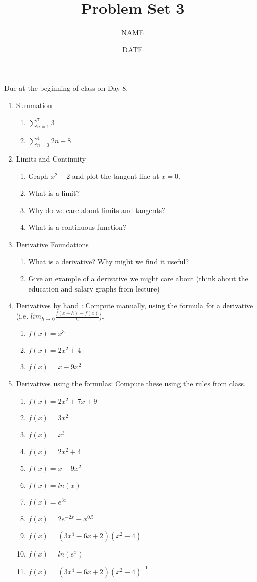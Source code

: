 \documentclass[12pt,thmsa]{article}
\title{Problem Set 3}
\author{NAME}
\date{DATE}
\begin{document}
\maketitle 

Due at the beginning of class on Day 8.  

\begin{enumerate}

    \item Summation
        \begin{enumerate}
            \item $\sum_{n=1}^{7}3$
            \item $\sum_{n=0}^{4} 2n+8$
        \end{enumerate}

    \item Limits and Continuity
        \begin{enumerate}
            \item Graph $x^2+2$ and plot the tangent line at $x=0$. 
            \item What is a limit?
            \item Why do we care about limits and tangents?
            \item What is a continuous function?
        \end{enumerate}

\item Derivative Foundations
\begin{enumerate}
\item What is a derivative? Why might we find it useful? 
\item Give an example of a derivative we might care about (think about the education and salary graphs from lecture) 
\end{enumerate}

\item Derivatives by hand : Compute manually, using the formula for a derivative (i.e. $ lim_{h\rightarrow0}\frac{f(x+h)-f(x)}{h}$). 
\begin{enumerate}
\item  $f(x) =x^3$
\item  $f(x) =2x^2+4$
\item  $f(x) =x-9x^2$ 
\end{enumerate}

\item Derivatives using the formulas: Compute these using the rules from class. 
\begin{enumerate}
\item  $f(x) = 2x^2 + 7x + 9$ 
\item  $f(x) = 3x^2$
\item  $f(x) =x^3$
\item  $f(x) =2x^2+4$
\item  $f(x) =x-9x^2$
\item  $f(x)=ln(x)$
\item $f(x)=e^{3x}$
\item $f(x)=2e^{-2x}-x^{0.5}$
\item $f(x)=(3x^4-6x+2)(x^2-4)$
\item $f(x)=ln(e^x)$
\item $f(x)=(3x^4-6x+2)(x^2-4)^{-1}$
\end{enumerate}


\end{enumerate}
\end{document}
